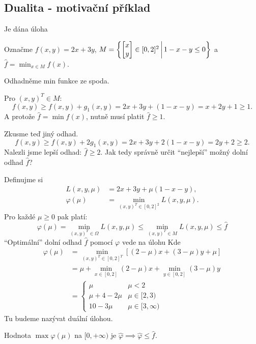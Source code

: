 \subsection{Dualita - motivační příklad}
Je dána úloha

Označme $f(x,y) = 2x + 3y$,
$
    M = \left\lbrace 
    \begin{bmatrix}
        x \\
        y
    \end{bmatrix} \in [0,2]^2 \, \middle| \, 1 - x - y \leq 0 \right\rbrace
$
a $\hat f = \min_{x\in M} f(x)$.

Odhadněme min funkce ze spoda. 

Pro $(x, y)^T \in M$: \[f(x, y) \geq f(x,y) + g_1(x,y) = 2x + 3y + (1-x-y) = x+2y+1 \geq 1.\]
A protože $\hat f = \min f(x)$, nutně musí platit $\hat f \geq 1$.

Zkusme teď jiný odhad.
\[f(x, y) \geq f(x,y) + 2g_1(x,y) = 2x + 3y + 2(1-x-y) = 2y + 2 \geq 2.\]
Nalezli jsme lepší odhad: $\hat f \geq 2$. Jak tedy správně určit \enquote{nejlepší} možný dolní odhad $\hat f$?

Definujme si
\begin{align*}
    L(x, y, \mu) &= 2x + 3y + \mu(1-x-y), \\
    \varphi(\mu) &= \min_{(x, y)^T \in [0,2]^2}L(x, y, \mu).
\end{align*}
Pro každé $\mu \geq 0$ pak platí:
\[
    \varphi(\mu) = \min_{(x, y)^T \in \Omega}L(x, y, \mu) \leq \min_{(x, y)^T \in M}L(x, y, \mu) \leq \hat f
\]
\enquote{Optimální} dolní odhad $\hat f$ pomocí $\varphi$ vede na úlohu
Kde
\begin{align*}
    \varphi(\mu) &= \min_{(x, y)^T \in [0,2]^T} \left[(2-\mu)x + (3-\mu)y + \mu\right] \\
    &= \mu + \min_{x \in [0,2]}(2-\mu)x + \min_{y \in [0,2]}(3-\mu)y \\
    &= 
    \begin{cases}
        \mu & \mu < 2 \\
        \mu + 4 - 2\mu & \mu \in [2, 3) \\
        10 - 3\mu & \mu \in [3, \infty)
    \end{cases}
\end{align*}
Tu budeme nazývat duální úlohou.

Hodnota $\max \varphi(\mu)$ na $[0, +\infty)$ je $\hat \varphi \implies \hat \varphi \leq \hat f$.

